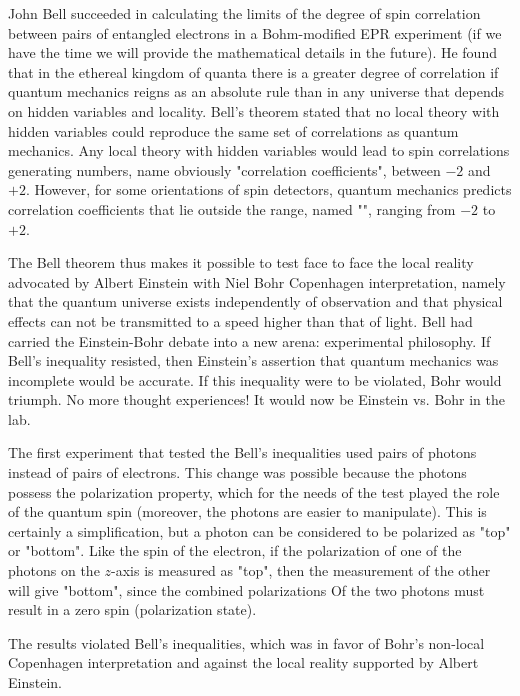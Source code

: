 	John Bell succeeded in calculating the limits of the degree of spin correlation between pairs of entangled electrons in a Bohm-modified EPR experiment (if we have the time we will provide the mathematical details in the future). He found that in the ethereal kingdom of quanta there is a greater degree of correlation if quantum mechanics reigns as an absolute rule than in any universe that depends on hidden variables and locality. Bell's theorem stated that no local theory with hidden variables could reproduce the same set of correlations as quantum mechanics. Any local theory with hidden variables would lead to spin correlations generating numbers, name obviously "correlation coefficients", between $-2$ and $+2$. However, for some orientations of spin detectors, quantum mechanics predicts correlation coefficients that lie outside the range, named "", ranging from $-2$ to $+2$.

	The Bell theorem thus makes it possible to test face to face the local reality advocated by Albert Einstein with Niel Bohr Copenhagen interpretation, namely that the quantum universe exists independently of observation and that physical effects can not be transmitted to a speed higher than that of light. Bell had carried the Einstein-Bohr debate into a new arena: experimental philosophy. If Bell's inequality resisted, then Einstein's assertion that quantum mechanics was incomplete would be accurate. If this inequality were to be violated, Bohr would triumph. No more thought experiences! It would now be Einstein vs. Bohr in the lab.
	
	The first experiment that tested the Bell's inequalities used pairs of photons instead of pairs of electrons. This change was possible because the photons possess the polarization property, which for the needs of the test played the role of the quantum spin (moreover, the photons are easier to manipulate). This is certainly a simplification, but a photon can be considered to be polarized as "top" or "bottom". Like the spin of the electron, if the polarization of one of the photons on the $z$-axis is measured as "top", then the measurement of the other will give "bottom", since the combined polarizations Of the two photons must result in a zero spin (polarization state).
	
	The results violated Bell's inequalities, which was in favor of Bohr's non-local Copenhagen  interpretation and against the local reality supported by Albert Einstein.
	
